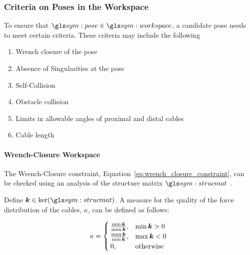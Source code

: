 		\subsubsection{Criteria on Poses in the Workspace}%
		\label{sec:criteria_on_poses_in_the_workspace}

			To ensure that $\pose\in\workspace$, a	candidate  pose  needs	to
			meet certain criteria.  These criteria may  include	the
			following

			\begin{enumerate}

				\item Wrench closure of the pose

				\item Absence of Singularities at the pose

				\item Self-Collision

				\item Obstacle collision

				\item Limits in allowable  angles  of  proximal  and  distal
					cables

				\item Cable length

			\end{enumerate}

			\paragraph{Wrench-Closure Workspace}%
			\label{sec:wrench_closure_workspace}

				The Wrench-Closure constraint,
				Equation~\ref{eq:wrench_closure_constraint}, can be checked
				using an analysis of the structure matrix
				$\strucmat$~\cite{bib:cdpr:cable_driven_parallel_robots_theory_and_application}.

				Define $\vec{k} \in \ker(\strucmat)$.  A measure for the quality
				of the force distribution of the cables, $\kappa$, can  be
				defined  as follows:

				\begin{equation}
					\kappa  =
						\begin{cases}
							\frac
							{%
								\min{\vec{k}}
							}
							{%
								\max{\vec{k}}
							},
							& \min{\vec{k}} > 0
							\\
							\frac
							{%
								\max{\vec{k}}
							}
							{%
								\min{\vec{k}}
							},
							& \max{\vec{k}} < 0
							\\
							0, & \text{otherwise}
						\end{cases}
				\end{equation}


